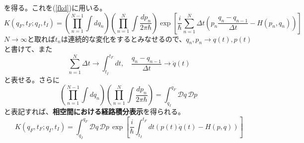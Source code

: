 \documentclass[10pt]{jsarticle}
\newcommand{\kakko}[1]{\left(#1 \right)} %
\newcommand{\kkakko}[1]{\left[ #1 \right]} %
\newcommand{\pms}[1]{\mathcal{D}#1\,}%
\numberwithin{equation}{section}%
\begin{document}
を得る。これを(\ref{fkd})に用いる。
\begin{equation}
 \label{sokukan1} K(q_{F},t_{F};q_{I},t_{I})=\kakko{\prod_{n=1}^{N-1}\int dq_{n}}\kakko{\prod_{n=1}^{N}\int \frac{dp_{n}}{2\pi \hbar}}\exp\kkakko{\frac{i}{\hbar}\sum_{n=1}^{N}\Delta t \kakko{ p_{n}\frac{q_{n}-q_{n-1}}{\Delta t} -H(p_{n},q_{n}) }}
\end{equation}
$N\to \infty$と取れば$t_{n}$は連続的な変化をするとみなせるので、$q_{n},p_{n}\to q(t),p(t)$と書けて、また
\begin{equation}
 \label{ryakki1} \sum_{n=1}^{N}\Delta t \to \int_{t_{I}}^{t_{F}} dt , \quad \frac{q_{n}-q_{n-1}}{\Delta t}\to \dot{q}(t)
\end{equation}
と表せる。さらに
\begin{equation}
\label{ryakki2}\kakko{\prod_{n=1}^{N-1}\int dq_{n}}\kakko{\prod_{n=1}^{N}\int \frac{dp_{n}}{2\pi \hbar}}=\int_{q_{I}}^{q_{F}} \pms{q}\pms{p}
\end{equation}
と表記すれば、{\bf 相空間における経路積分表示}を得られる。
\begin{equation}
   \label{sokukan} K(q_{F},t_{F};q_{I},t_{I})=\int_{q_I}^{q_{F}} \pms{q}\pms{p}\exp\kkakko{\frac{i}{\hbar}\int_{t_{I}}^{t_{F}}dt\kakko{p(t)\dot{q}(t)-H(p,q)} }
\end{equation}
\end{document}
